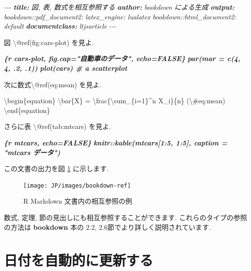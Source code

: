 \documentclass[
  11pt,
  lualatex,ja=standard,jafont=noto]{bxjsreport}
\newenvironment{Shaded}{\begin{snugshade}}{\end{snugshade}}
\newcommand{\AnnotationTok}[1]{\textcolor[rgb]{0.56,0.35,0.01}{\textbf{\textit{#1}}}}
\newcommand{\CommentTok}[1]{\textcolor[rgb]{0.56,0.35,0.01}{\textit{#1}}}
\newcommand{\InformationTok}[1]{\textcolor[rgb]{0.56,0.35,0.01}{\textbf{\textit{#1}}}}
\newcommand{\NormalTok}[1]{#1}
\newcommand{\SpecialCharTok}[1]{\textcolor[rgb]{0.00,0.00,0.00}{#1}}
\begin{document}
\begin{Shaded}
\begin{Highlighting}[]
\CommentTok{{-}{-}{-}}
\AnnotationTok{title:}\CommentTok{ 図, 表, 数式を相互参照する}
\AnnotationTok{author:}\CommentTok{ bookdown による生成}
\AnnotationTok{output:}
\CommentTok{  bookdown::pdf\_document2:}
\CommentTok{    latex\_engine: lualatex}
\CommentTok{  bookdown::html\_document2: default}
\AnnotationTok{documentclass:}\CommentTok{ ltjsarticle}
\CommentTok{{-}{-}{-}}

\NormalTok{図 \textbackslash{}@ref(fig:cars{-}plot) を見よ.}

\InformationTok{\textasciigrave{}\textasciigrave{}\textasciigrave{}\{r cars{-}plot, fig.cap="自動車のデータ", echo=FALSE\}}
\InformationTok{par(mar = c(4, 4, .2, .1))}
\InformationTok{plot(cars)  \# a scatterplot}
\InformationTok{\textasciigrave{}\textasciigrave{}\textasciigrave{}}

\NormalTok{次に数式\textbackslash{}@ref(eq:mean) を見よ.}

\NormalTok{\textbackslash{}begin\{equation\}}
\NormalTok{\textbackslash{}bar\{X\} = \textbackslash{}frac\{\textbackslash{}sum\_\{i=1\}\^{}n X\_i\}\{n\} (}\SpecialCharTok{\textbackslash{}\#}\NormalTok{eq:mean)}
\NormalTok{\textbackslash{}end\{equation\}}

\NormalTok{さらに表 \textbackslash{}@ref(tab:mtcars) を見よ.}

\InformationTok{\textasciigrave{}\textasciigrave{}\textasciigrave{}\{r mtcars, echo=FALSE\}}
\InformationTok{knitr::kable(mtcars[1:5, 1:5], caption = "mtcars データ")}
\InformationTok{\textasciigrave{}\textasciigrave{}\textasciigrave{}}
\end{Highlighting}
\end{Shaded}

この文書の出力を図 \ref{fig:bookdown-ref} に示します.

\begin{figure}

{\centering \texttt{[image: JP/images/bookdown-ref]} 

}

\caption{R Markdown 文書内の相互参照の例}\label{fig:bookdown-ref}
\end{figure}

数式, 定理, 節の見出しにも相互参照することができます. これらのタイプの参照の方法は \textbf{bookdown} 本の 2.2, 2.6節でより詳しく説明されています.

\hypertarget{update-date}{%
\section{日付を自動的に更新する}\label{update-date}}
\end{document}
